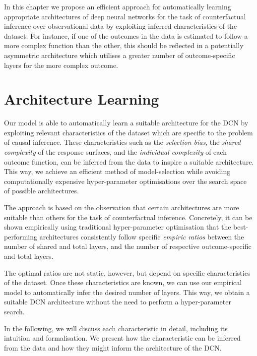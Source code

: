 In this chapter we propose an efficient approach for automatically learning appropriate architectures of deep neural networks for the task of counterfactual inference over observational data by exploiting inferred characteristics of the dataset. For instance, if one of the outcomes in the data is estimated to follow a more complex function than the other, this should be reflected in a potentially asymmetric architecture which utilises a greater number of outcome-specific layers for the more complex outcome.




\section{Architecture Learning}
Our model is able to automatically learn a suitable architecture for the DCN by exploiting relevant characteristics of the dataset which are specific to the problem of causal inference. These characteristics such as the \emph{selection bias}, the \emph{shared complexity} of the response surfaces, and the \emph{individual complexity} of each outcome function, can be inferred from the data to inspire a suitable architecture. This way, we achieve an efficient method of model-selection while avoiding computationally expensive hyper-parameter optimisations over the search space of possible architectures. 

The approach is based on the observation that certain architectures are more suitable than others for the task of counterfactual inference. Concretely, it can be shown empirically using traditional hyper-parameter optimisation that the best-performing architectures consistently follow specific \emph{ empiric ratios} between the number of shared and total layers, and the number of respective outcome-specific and total layers.

The optimal ratios are not static, however, but depend on specific characteristics of the dataset. Once these characteristics are known, we can use our empirical model to automatically infer the desired number of layers. This way, we obtain a suitable DCN architecture without the need to perform a hyper-parameter search.

In the following, we will discuss each characteristic in detail, including its intuition and formalisation. We present how the characteristic can be inferred from the data and how they might inform the architecture of the DCN.


